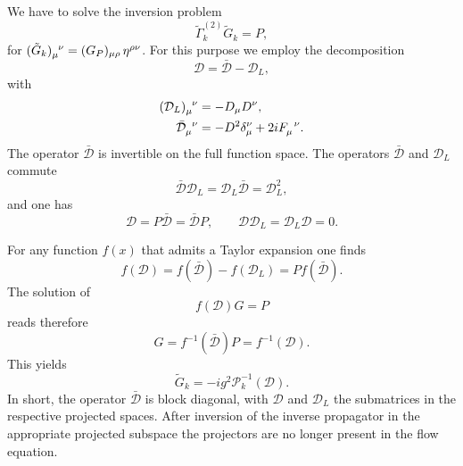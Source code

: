 \documentclass[twocolumn,aps,prd,amsmath,amssymb,preprintnumbers,longbibliography]{revtex4-1}
\numberwithin{equation}{section}
\newenvironment{alignedeqn}{\begin{equation}\begin{aligned}}{\end{aligned}\end{equation}\ignorespacesafterend}
\begin{document}
We have to solve the inversion problem
\begin{equation}\label{eqn:F10a}
	\tilde\Gamma^{(2)}_k \tilde{G}_k
	= P,
\end{equation}
for $\tensor{(\tilde{G}_k)}{_\mu^\nu} = (G_P)_{\mu\rho} \, \eta^{\rho\nu}$. For this purpose we employ the decomposition \cite{RW}
\begin{equation}\label{eqn:F11a}
	\mathcal{D}
	= \bar{\mathcal{D}} - \mathcal{D}_L,
\end{equation}
with
\begin{alignedeqn}\label{eqn:F12a}
	\tensor{(\mathcal{D}_L)}{_\mu^\nu}
	&= -D_\mu D^\nu,\\
	\tensor{\bar{\mathcal{D}}}{_\mu^\nu}
	&= -D^2\delta^\nu_\mu + 2i \tensor{F}{_\mu^\nu}.
\end{alignedeqn}
The operator $\bar{\mathcal{D}}$ is invertible on the full function space. The operators $\bar{\mathcal{D}}$ and $\mathcal{D}_L$ commute
\begin{equation}\label{eqn:F13a}
	\bar{\mathcal{D}} \mathcal{D}_L
	= \mathcal{D}_L \bar{\mathcal{D}}
	= \mathcal{D}^2_L,
\end{equation}
and one has
\begin{equation}\label{eqn:F14a}
	\mathcal{D}
	= P \bar{\mathcal{D}}
	= \bar{\mathcal{D}} P,
	\qquad
	\mathcal{D} \mathcal{D}_L
	= \mathcal{D}_L\mathcal{D}
	= 0.
\end{equation}


For any function $f(x)$ that admits a Taylor expansion one finds
\begin{equation}\label{eqn:F15a}
	f(\mathcal{D})
	= f(\bar{\mathcal{D}}) - f(\mathcal{D}_L)
	= P f(\bar{\mathcal{D}}).
\end{equation}
The solution of
\begin{equation}\label{eqn:F16a}
	f(\mathcal{D}) G
	= P
\end{equation}
reads therefore
\begin{equation}\label{eqn:F17a}
	G
	= f^{-1}(\bar{\mathcal{D}}) P
	= f^{-1}(\mathcal{D}).
\end{equation}
This yields
\begin{equation}\label{eqn:F18a}
	\tilde{G}_k
	= -i g^2 \mathcal{P}^{-1}_k(\mathcal{D}).
\end{equation}
In short, the operator $\bar{\mathcal{D}}$ is block diagonal, with $\mathcal{D}$ and $\mathcal{D}_L$ the submatrices in the respective projected spaces. After inversion of the inverse propagator in the appropriate projected subspace the projectors are no longer present in the flow equation.
\end{document}
